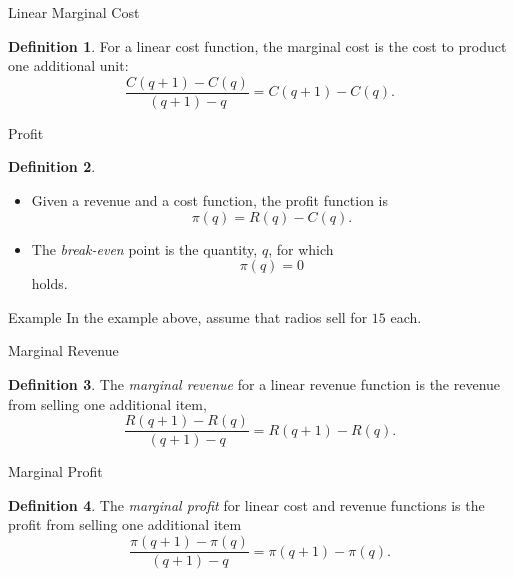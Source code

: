 \documentclass{beamer}
\theoremstyle{definition}
\newtheorem{defn}{Definition}
\newtheorem{rmk}{Remark}
\begin{document}
\begin{frame}{Linear Marginal Cost}
  \begin{defn}
    For a linear cost function, the marginal cost is the cost to product one additional unit:
    $$\frac{C(q + 1) - C(q)}{(q + 1) - q} = C(q + 1) - C(q).$$
  \end{defn}
\end{frame}

\begin{frame}{Profit}
  \begin{defn}
    \begin{itemize}
    \item<1->
      Given a revenue and a cost function, the profit function is
      $$\pi(q) = R(q) - C(q).$$
    \item<2->
      The {\it break-even} point is the quantity, $q$, for which
      $$\pi(q) = 0$$
      holds.
    \end{itemize}
  \end{defn}
\end{frame}

\begin{frame}{Example}
  In the example above, assume that radios sell for $15$ each.
\end{frame}

\begin{frame}{Marginal Revenue}
  \begin{defn}
    The {\it marginal revenue} for a linear revenue function is the revenue from selling one additional item,
    $$\frac{R(q + 1) - R(q)}{(q + 1) - q} = R(q + 1) - R(q).$$
  \end{defn}
\end{frame}
    
\begin{frame}{Marginal Profit}
  \begin{defn}
    The {\it marginal profit} for linear cost and revenue functions is the profit from selling one additional item
    $$\frac{\pi(q+1) - \pi(q)}{(q + 1) - q} = \pi(q + 1) - \pi(q).$$
  \end{defn}
  
\end{frame}
\end{document}

